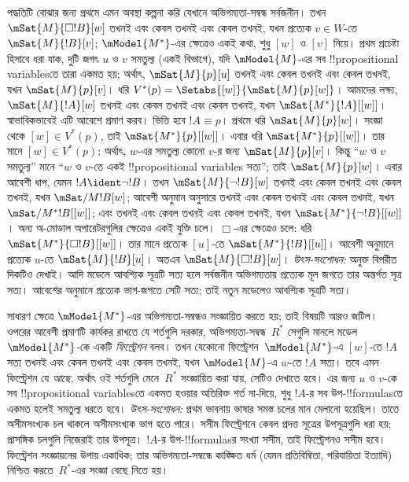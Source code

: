 \documentclass[../../../include/open-logic-section]{subfiles}
\begin{document}
পদ্ধতিটি বোঝার জন্য প্রথমে এমন অবস্থা কল্পনা করি যেখানে অভিগম্যতা-সম্বন্ধ সর্বজনীন। তখন $\mSat{M}{\Box !B}[w]$ তখনই এবং কেবল তখনই এবং কেবল তখনই, যখন প্রত্যেক $v \in W$-তে $\mSat{M}{!B}[v]$; $\mModel{M^*}$-এর ক্ষেত্রেও একই কথা, শুধু $[w]$ ও $[v]$ নিয়ে। প্রথম প্রচেষ্টা হিসাবে ধরা যাক, দুটি জগৎ $u$ ও $v$ সমতুল্য (একই বিভাগে), যদি $\mModel{M}$-এর সব !!{propositional variable}sতে তারা একমত হয়; অর্থাৎ, $\mSat{M}{p}[u]$ তখনই এবং কেবল তখনই এবং কেবল তখনই, যখন $\mSat{M}{p}[v]$। ধরি $V^*(p) = \Setabs{[w]}{\mSat{M}{p}[w]}$। আমাদের লক্ষ্য, $\mSat{M}{!A}[w]$ তখনই এবং কেবল তখনই এবং কেবল তখনই, যখন $\mSat{M^*}{!A}[{[w]}]$। স্বাভাবিকভাবেই এটি আবেশে প্রমাণ করব। ভিত্তি হবে $!A \equiv p$। প্রথমে ধরি $\mSat{M}{p}[w]$। সংজ্ঞা থেকে $[w] \in V^*(p)$, তাই $\mSat{M^*}{p}[{[w]}]$। এবার ধরি $\mSat{M^*}{p}[{[w]}]$। তার মানে $[w] \in V^*(p)$; অর্থাৎ, $w$-এর সমতুল্য কোনো $v$-র জন্য $\mSat{M}{p}[v]$। কিন্তু “$w$ ও $v$ সমতুল্য” মানে “$w$ ও $v$-তে একই !!{propositional variable}s সত্য”; তাই $\mSat{M}{p}[w]$। এবার আবেশী ধাপ, যেমন $!A
\ident \lnot !B$। তখন $\mSat{M}{\lnot !B}[w]$ তখনই এবং কেবল তখনই এবং কেবল তখনই, যখন $\mSat/{M}{!B}[w]$; আবেশী অনুমান অনুসারে তখনই এবং কেবল তখনই এবং কেবল তখনই, যখন $\mSat/{M^*}{!B}[{[w]}]$; এবং তখনই এবং কেবল তখনই এবং কেবল তখনই, যখন $\mSat{M^*}{\lnot !B}[{[w]}]$। অন্য অ-মোডাল অপারেটরগুলির ক্ষেত্রেও একই যুক্তি চলে। $\Box$-এর ক্ষেত্রেও চলে: ধরি $\mSat{M^*}{\Box
  !B}[{[w]}]$। তার মানে প্রত্যেক $[u]$-তে $\mSat{M^*}{!B}[{[u]}]$। আবেশী অনুমানে প্রত্যেক $u$-তে $\mSat{M}{!B}[u]$। অতএব $\mSat{M}{\Box !B}[w]$।
\emph{উৎস-সংশোধন:} অনুক্ত বিপরীত দিকটিও দেখাই। আদি মডেলে আবশ্যিক সূত্রটি সত্য হলে সর্বজনীন অভিগম্যতায় প্রত্যেক মূল জগতে তার অন্তর্গত সূত্র সত্য। আবেশের অনুমানে প্রত্যেক ভাগ-জগতে সেটি সত্য; তাই নতুন মডেলেও আবশ্যিক সূত্রটি সত্য।

সাধারণ ক্ষেত্রে $\mModel{M^*}$-এর অভিগম্যতা-সম্বন্ধও সংজ্ঞায়িত করতে হয়; তাই বিষয়টি আরও জটিল। ওপরের আবেশী প্রমাণটি কার্যকর রাখতে যে শর্তগুলি দরকার, অভিগম্যতা-সম্বন্ধ~$R^*$ সেগুলি মানলে মডেল~$\mModel{M^*}$-কে একটি \emph{ফিল্ট্রেশন} বলব। তখন যেকোনো ফিল্ট্রেশন~$\mModel{M^*}$-এ $[w]$-তে $!A$ সত্য তখনই এবং কেবল তখনই এবং কেবল তখনই, যখন $\mModel{M}$-এ $w$-তে $!A$ সত্য। তবে এমন ফিল্ট্রেশন যে \emph{আছে}, অর্থাৎ ওই শর্তগুলি মেনে~$R^*$ সংজ্ঞায়িত করা যায়, সেটিও দেখাতে হবে। এর জন্য $u$ ও $v$-কে সব !!{propositional variable}sতে একমত হওয়ার অতিরিক্ত শর্ত না-দিয়ে, শুধু $!A$-র সব উপ-!!{formula}sতে একমত হলেই সমতুল্য ধরতে হবে।
\emph{উৎস-সংশোধন:} প্রথম ভাবনায় ভাষার সমস্ত চলের মান মেলানো হয়েছিল। তাতে অসীমসংখ্যক চল থাকলে অসীমসংখ্যক ভাগ হতে পারে। সসীম ফিল্ট্রেশনে কেবল প্রদত্ত সূত্রের উপসূত্রগুলি ধরা হয়; প্রাসঙ্গিক চলগুলি নিজেরাই তার উপসূত্র।
$!A$-র উপ-!!{formula}sর সংখ্যা সসীম, তাই ফিল্ট্রেশনও সসীম হবে। ফিল্ট্রেশন সংজ্ঞায়নের উপায় একাধিক; তার অভিগম্যতা-সম্বন্ধে কাঙ্ক্ষিত ধর্ম (যেমন প্রতিবিম্বিতা, পরিযায়িতা ইত্যাদি) নিশ্চিত করতে~$R^*$-এর সংজ্ঞা বেছে নিতে হয়।
\end{document}
